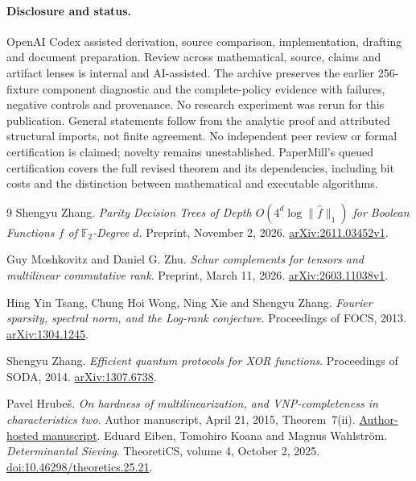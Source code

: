 \documentclass[11pt]{article}
\theoremstyle{remark}\newtheorem{remark}[theorem]{Remark}
\newcommand{\F}{\mathbb F}
\begin{document}
\paragraph{Disclosure and status.}
OpenAI Codex assisted derivation, source comparison, implementation, drafting and document preparation. Review across mathematical, source, claims and artifact lenses is internal and AI-assisted. The archive preserves the earlier 256-fixture component diagnostic and the complete-policy evidence with failures, negative controls and provenance. No research experiment was rerun for this publication. General statements follow from the analytic proof and attributed structural imports, not finite agreement. No independent peer review or formal certification is claimed; novelty remains unestablished. PaperMill's queued certification covers the full revised theorem and its dependencies, including bit costs and the distinction between mathematical and executable algorithms.

\clearpage
\begin{thebibliography}{9}
Shengyu Zhang.
\emph{Parity Decision Trees of Depth $O(4^d\log\|\widehat f\|_1)$ for Boolean Functions $f$ of $\F_2$-Degree $d$}.
Preprint, November 2, 2026.
\href{https://arxiv.org/abs/2611.03452v1}{arXiv:2611.03452v1}.

Guy Moshkovitz and Daniel G. Zhu.
\emph{Schur complements for tensors and multilinear commutative rank}.
Preprint, March 11, 2026.
\href{https://arxiv.org/abs/2603.11038v1}{arXiv:2603.11038v1}.

Hing Yin Tsang, Chung Hoi Wong, Ning Xie and Shengyu Zhang.
\emph{Fourier sparsity, spectral norm, and the Log-rank conjecture}.
Proceedings of FOCS, 2013.
\href{https://arxiv.org/abs/1304.1245}{arXiv:1304.1245}.

Shengyu Zhang.
\emph{Efficient quantum protocols for XOR functions}.
Proceedings of SODA, 2014.
\href{https://arxiv.org/abs/1307.6738}{arXiv:1307.6738}.

Pavel Hrube\v{s}.
\emph{On hardness of multilinearization, and VNP-completeness in characteristics two}.
Author manuscript, April 21, 2015, Theorem~7(ii).
\href{https://users.math.cas.cz/~hrubes/PDFs/Mult.pdf}{Author-hosted manuscript}.
Eduard Eiben, Tomohiro Koana and Magnus Wahlstr\"om.
\emph{Determinantal Sieving}.
TheoretiCS, volume 4, October 2, 2025.
\href{https://doi.org/10.46298/theoretics.25.21}{doi:10.46298/theoretics.25.21}.
\end{thebibliography}
\end{document}
